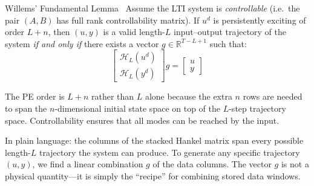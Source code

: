 \begin{defnbox}{Willems' Fundamental Lemma~\cite{Willems2005}}
	Assume the LTI system is \emph{controllable} (i.e.\ the pair $(A, B)$ has full rank controllability matrix). If $u^d$ is persistently exciting of order $L + n$, then $(u, y)$ is a valid length-$L$ input--output trajectory of the system \emph{if and only if} there exists a vector $g \in \mathbb{R}^{T-L+1}$ such that:
	\begin{equation}\label{eq:fundamental_lemma}
		\begin{bmatrix} \mathcal{H}_L(u^d) \\ \mathcal{H}_L(y^d) \end{bmatrix} g = \begin{bmatrix} u \\ y \end{bmatrix}
	\end{equation}
\end{defnbox}

The PE order is $L + n$ rather than $L$ alone because the extra $n$ rows are needed to span the $n$-dimensional initial state space on top of the $L$-step trajectory space. Controllability ensures that all modes can be reached by the input.

In plain language: the columns of the stacked Hankel matrix span every possible length-$L$ trajectory the system can produce. To generate any specific trajectory $(u, y)$, we find a linear combination $g$ of the data columns. The vector $g$ is not a physical quantity---it is simply the ``recipe'' for combining stored data windows.

